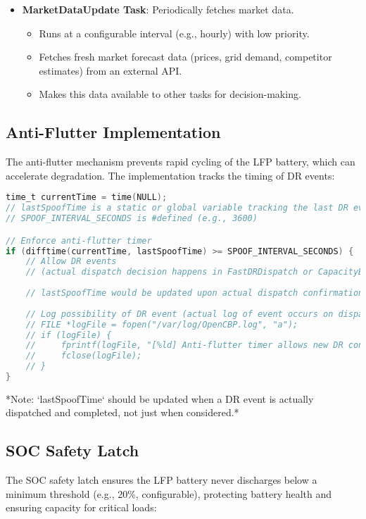 \documentclass[11pt,a4paper]{article}
\begin{document}
\begin{itemize}
    \item \textbf{MarketDataUpdate Task}: Periodically fetches market data.
    \begin{itemize}
        \item Runs at a configurable interval (e.g., hourly) with low priority.
        \item Fetches fresh market forecast data (prices, grid demand, competitor estimates) from an external API.
        \item Makes this data available to other tasks for decision-making.
    \end{itemize}
\end{itemize}

\subsection{Anti-Flutter Implementation}
The anti-flutter mechanism prevents rapid cycling of the LFP battery, which can accelerate degradation. The implementation tracks the timing of DR events:

\begin{lstlisting}[language=C, caption=Anti-Flutter Timer Implementation (Conceptual Snippet from `SpoofSOC` Task), label=lst:anti-flutter]
time_t currentTime = time(NULL);
// lastSpoofTime is a static or global variable tracking the last DR event dispatch
// SPOOF_INTERVAL_SECONDS is #defined (e.g., 3600)

// Enforce anti-flutter timer
if (difftime(currentTime, lastSpoofTime) >= SPOOF_INTERVAL_SECONDS) {
    // Allow DR events 
    // (actual dispatch decision happens in FastDRDispatch or CapacityBidding)
    
    // lastSpoofTime would be updated upon actual dispatch confirmation
    
    // Log possibility of DR event (actual log of event occurs on dispatch)
    // FILE *logFile = fopen("/var/log/OpenCBP.log", "a");
    // if (logFile) {
    //     fprintf(logFile, "[%ld] Anti-flutter timer allows new DR consideration.\n", currentTime);
    //     fclose(logFile);
    // }
}
\end{lstlisting}
*Note: `lastSpoofTime` should be updated when a DR event is actually dispatched and completed, not just when considered.*

\subsection{SOC Safety Latch}
The SOC safety latch ensures the LFP battery never discharges below a minimum threshold (e.g., 20\%, configurable), protecting battery health and ensuring capacity for critical loads:
\end{document}

